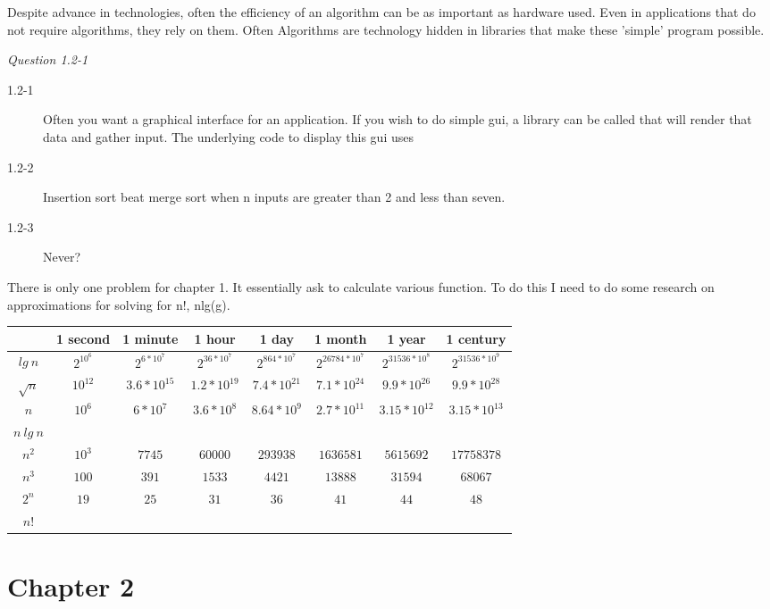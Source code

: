 \documentclass{article}
\begin{document}
Despite advance in technologies, often the efficiency of an algorithm can be as
important as hardware used. Even in applications that do not require
algorithms, they rely on them. Often Algorithms are technology hidden in
libraries that make these 'simple' program possible. 

\textit{Question 1.2-1}
\begin{description}
\item[1.2-1]
Often you want a graphical interface for an application. If you wish to do
simple gui, a library can be called that will render that data and gather
input. The underlying code to display this gui uses   
\item[1.2-2]
Insertion sort beat merge sort when n inputs are greater than 2 and less than
seven. 
\item[1.2-3] 
Never?
\end{description}
There is only one problem for chapter 1. It essentially ask to calculate
various function. To do this I need to do some research on approximations for
solving for n!, nlg(g).
\begin{table}
\begin{center}
\begin{tabular}{|c||c|c|c|c|c|c|c|}
\hline
 & 1 second & 1 minute & 1 hour & 1 day & 1 month & 1 year & 1 century \\ \hline \hline 
$lg\:n$     & $2^{10^6}$ & $2^{6*10^7}$ & $2^{36*10^7}$ & $2^{864*10^7}$ &
$2^{26784*10^7}$ & $2^{31536*10^8}$ & $2^{31536*10^9}$ \\ \hline 
$\sqrt{n}$  & $10^{12}$ & $3.6*10^{15}$ &  $1.2*10^{19}$ & $7.4*10^{21}$ &
$7 .1*10^{24}$ &  $9.9*10^{26}$ & $9.9*10^{28}$ \\ \hline 
$n$         & $10^{6}$ &  $6*10^{7}$ & $3.6*10^{8}$ &  $8.64*10^{9}$ &
$2.7*10^{11}$ &  $3.15*10^{12}$ & $3.15*10^{13}$  \\ \hline 
$n\:lg\:n$  & & & & & & & \\ \hline 
$n^2$       &  $10^3$ & $7745$ & $60000$ & $293938$ & $1636581$ & $5615692$ &
$17758378$ \\ \hline 
$n^3$       & $100$ & $391$ & $1533$ & $4421$ & $13888$ & $31594$ & $68067$ \\ \hline 
$2^n$       & $19$ & $25$ & $31$ & $36$ & $41$ &  $44$ & $48$ \\ \hline 
$n!$        & & & & & & & \\ \hline 
\end{tabular}
\end{center}
\end{table}
\section*{Chapter 2}
\end{document}
